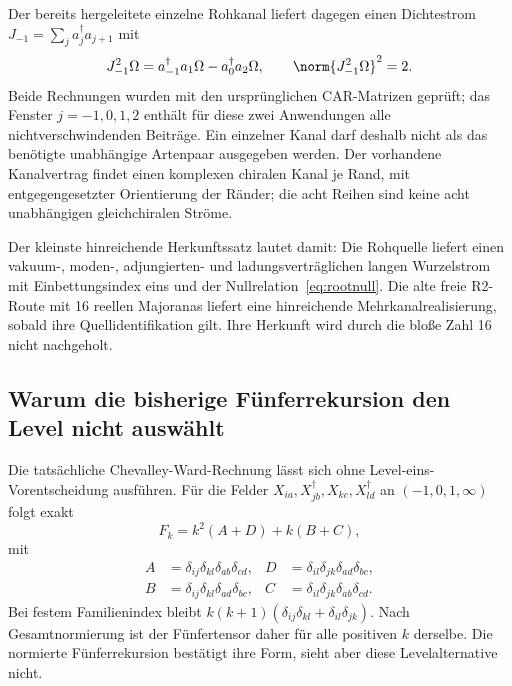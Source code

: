 Der bereits hergeleitete einzelne Rohkanal liefert dagegen einen Dichtestrom $J_{-1}=\sum_j a_j^\dagger a_{j+1}$ mit
\begin{equation}
J_{-1}^2\Omega=a_{-1}^\dagger a_1\Omega-a_0^\dagger a_2\Omega,
\qquad\norm{J_{-1}^2\Omega}^2=2.
\end{equation}
Beide Rechnungen wurden mit den ursprünglichen CAR-Matrizen geprüft; das Fenster $j=-1,0,1,2$ enthält für diese zwei Anwendungen alle nichtverschwindenden Beiträge. Ein einzelner Kanal darf deshalb nicht als das benötigte unabhängige Artenpaar ausgegeben werden. Der vorhandene Kanalvertrag findet einen komplexen chiralen Kanal je Rand, mit entgegengesetzter Orientierung der Ränder; die acht Reihen sind keine acht unabhängigen gleichchiralen Ströme.


Der kleinste hinreichende Herkunftssatz lautet damit: Die Rohquelle liefert einen vakuum-, moden-, adjungierten- und ladungsverträglichen langen Wurzelstrom mit Einbettungsindex eins und der Nullrelation~\eqref{eq:rootnull}. Die alte freie R2-Route mit 16 reellen Majoranas liefert eine hinreichende Mehrkanalrealisierung, sobald ihre Quellidentifikation gilt. Ihre Herkunft wird durch die bloße Zahl 16 nicht nachgeholt.

\subsection{Warum die bisherige Fünferrekursion den Level nicht auswählt}
Die tatsächliche Chevalley-Ward-Rechnung lässt sich ohne Level-eins-Vorentscheidung ausführen. Für die Felder $X_{ia},X_{jb}^\dagger,X_{kc},X_{ld}^\dagger$ an $(-1,0,1,\infty)$ folgt exakt
\begin{equation}
F_k=k^2(A+D)+k(B+C),
\end{equation}
mit
\begin{align}
A&=\delta_{ij}\delta_{kl}\delta_{ab}\delta_{cd},&
D&=\delta_{il}\delta_{jk}\delta_{ad}\delta_{bc},\\
B&=\delta_{ij}\delta_{kl}\delta_{ad}\delta_{bc},&
C&=\delta_{il}\delta_{jk}\delta_{ab}\delta_{cd}.
\end{align}
Bei festem Familienindex bleibt $k(k+1)(\delta_{ij}\delta_{kl}+\delta_{il}\delta_{jk})$. Nach Gesamtnormierung ist der Fünfertensor daher für alle positiven $k$ derselbe. Die normierte Fünferrekursion bestätigt ihre Form, sieht aber diese Levelalternative nicht.

